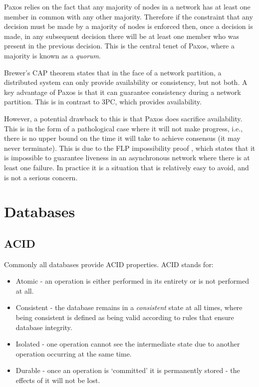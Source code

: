 \documentclass[12pt,twoside,notitlepage]{report}
\begin{document}
Paxos relies on the fact that any majority of nodes in a network has at least one member in common
with any other majority. Therefore if the constraint that any decision must be made by a majority
of nodes is enforced then, once a decision is made, in any subsequent decision there will be at
least one member who was present in the previous decision. This is the central tenet of Paxos,
where a majority is known as a \emph{quorum}.

Brewer's CAP theorem\cite{brewer2000}\cite{gilbert2002} states that in the face of a
network partition, a distributed system can only provide availability or consistency, but not
both. A key advantage of Paxos is that it can guarantee consistency during a network partition.
This is in contrast to 3PC, which provides availability.

However, a potential drawback to this is that Paxos does sacrifice availability. This is in the
form of a pathological case where it will not make progress, i.e., there is no upper bound on the
time it will take to achieve consensus (it may never terminate). This is due to the FLP
impossibility proof \cite{fischer85}, which states that it is impossible to guarantee liveness in
an asynchronous network where there is at least one failure.  In practice it is a situation that
is relatively easy to avoid, and is not a serious concern.

\section{Databases}

\subsection*{ACID}

Commonly all databases provide ACID properties. ACID stands for:

\begin{itemize}
\item Atomic - an operation is either performed in its entirety or is not performed at all.
\item Consistent - the database remains in a \emph{consistent} state at all times, where being
	consistent is defined as being valid according to rules that ensure database integrity.
\item Isolated - one operation cannot see the intermediate state due to another operation occurring
	at the same time.
\item Durable - once an operation is `committed' it is permanently stored - the effects of it will
	not be lost.
\end{itemize}
\end{document}

